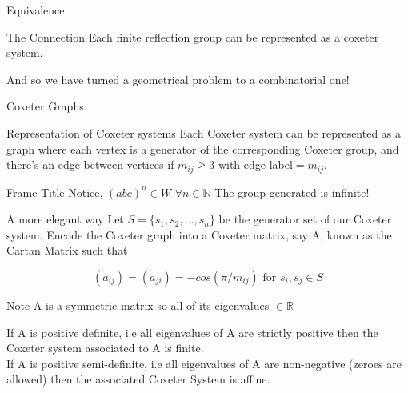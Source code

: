 \documentclass[aspectratio=169,xcolor=dvipsnames]{beamer}
\begin{document}
\begin{frame}{Equivalence}
\begin{alertblock}{The Connection}
    Each finite reflection group can be represented as a coxeter system.
\end{alertblock}
And so we have turned a geometrical problem to a combinatorial one!    
\end{frame}

\begin{frame}{Coxeter Graphs}
    \begin{block}{Representation of Coxeter systems}
        Each Coxeter system can be represented as a graph where each vertex is a generator of the corresponding Coxeter group, and there's an edge between vertices if $m_{ij}\geq3$ with edge label$=m_{ij}$.
    \end{block}
\end{frame}

\begin{frame}{A combinatorial approach}
We saw before how $\langle s, t\rangle$ with $m_{st} =3$ was the finite group $D_6$

What about? 
\begin{figure}
    \centering
    \texttt{[image: A\{21]}.png}
    \caption{Enter Caption}
    \label{fig:enter-label}
\end{figure}
\end{frame}

\begin{frame}{Frame Title}
    Notice, $(abc)^n \in W $ $\forall n\in \mathbb{N}$
    The group generated is infinite!
\end{frame}

\begin{frame}{A more elegant way}
Let $S=\{s_1, s_2, ..., s_n\}$ be the generator set of our Coxeter system.
Encode the Coxeter graph into a Coxeter matrix, say A, known as the \alert{Cartan Matrix} such that 

\[(a_{ij}) = (a_{ji})= -cos(\pi/m_{ij}) \text{ for } s_i, s_j \in S\]

\begin{alertblock}{Note}
    A is a symmetric matrix so all of its eigenvalues $\in \mathbb{R}$
\end{alertblock}

\begin{theorem}
    If A is positive definite, i.e all eigenvalues of A are strictly positive then the Coxeter system associated to A is finite.\\
    If A is positive semi-definite, i.e all eigenvalues of A are non-negative (zeroes are allowed) then the associated Coxeter System is affine.
\end{theorem}
    
\end{frame}
\end{document}
